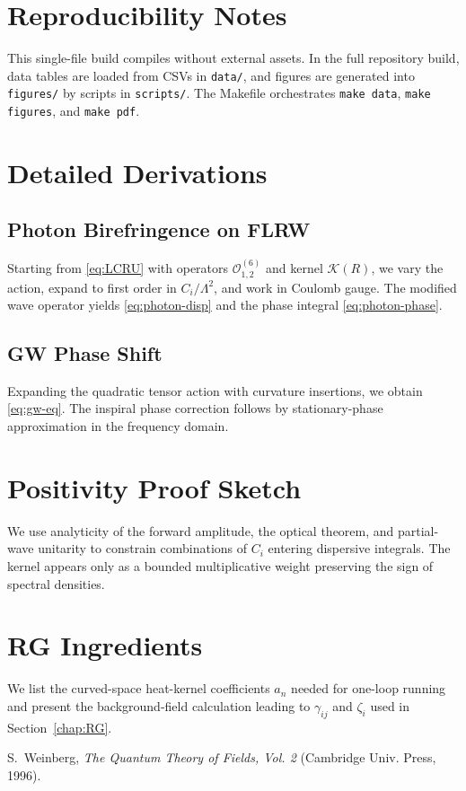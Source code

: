\documentclass[12pt,a4paper,oneside]{scrbook}
\theoremstyle{definition}
\theoremstyle{remark}
\newcommand{\K}{\mathcal{K}}
\begin{document}
\chapter{Reproducibility Notes}
\label{chap:repro}
This single-file build compiles without external assets. In the full repository build, data tables are loaded from CSVs in \texttt{data/}, and figures are generated into \texttt{figures/} by scripts in \texttt{scripts/}. The Makefile orchestrates \texttt{make data}, \texttt{make figures}, and \texttt{make pdf}.
\appendix
\chapter{Detailed Derivations}
\label{app:derivations}
\section{Photon Birefringence on FLRW}
\label{app:photon-deriv}
Starting from \eqref{eq:LCRU} with operators $\mathcal{O}^{(6)}_{1,2}$ and kernel $\K(R)$, we vary the action, expand to first order in $C_i/\Lambda^2$, and work in Coulomb gauge. The modified wave operator yields \eqref{eq:photon-disp} and the phase integral \eqref{eq:photon-phase}.
\section{GW Phase Shift}
\label{app:gw-deriv}
Expanding the quadratic tensor action with curvature insertions, we obtain \eqref{eq:gw-eq}. The inspiral phase correction follows by stationary-phase approximation in the frequency domain.
\chapter{Positivity Proof Sketch}
\label{app:positivity}
We use analyticity of the forward amplitude, the optical theorem, and partial-wave unitarity to constrain combinations of $C_i$ entering dispersive integrals. The kernel appears only as a bounded multiplicative weight preserving the sign of spectral densities.
\chapter{RG Ingredients}
\label{app:RG}
We list the curved-space heat-kernel coefficients $a_n$ needed for one-loop running and present the background-field calculation leading to $\gamma_{ij}$ and $\zeta_i$ used in Section~\ref{chap:RG}.
\begin{thebibliography}{99}
S.~Weinberg, \emph{The Quantum Theory of Fields, Vol. 2} (Cambridge Univ. Press, 1996).
\end{thebibliography}
\printindex
\end{document}
